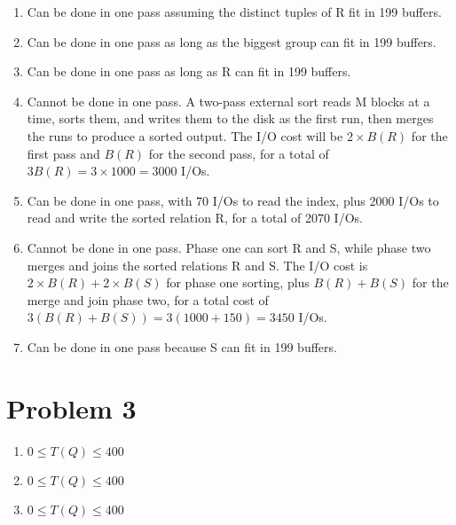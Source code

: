 \documentclass[a4paper, 12pt]{article}
\begin{document}
\begin{enumerate}[label=(\alph*)]
	\item Can be done in one pass assuming the distinct tuples of R fit in 199
		buffers.
	\item Can be done in one pass as long as the biggest group can fit in 199
		buffers.
	\item Can be done in one pass as long as R can fit in 199 buffers.
	\item Cannot be done in one pass. A two-pass external sort reads M blocks at
		a time, sorts them, and writes them to the disk as the first run, then
		merges the runs to produce a sorted output. The I/O cost will be $ 2
		\times B(R) $ for the first pass and $ B(R) $ for the second pass, for a
		total of $ 3 B(R) = 3 \times 1000 = 3000 $ I/Os.
	\item Can be done in one pass, with 70 I/Os to read the index, plus 2000
		I/Os to read and write the sorted relation R, for a total of 2070 I/Os.
	\item Cannot be done in one pass. Phase one can sort R and S, while phase
		two merges and joins the sorted relations R and S. The I/O cost is $ 2
		\times B(R) + 2 \times B(S) $ for phase one sorting, plus $ B(R) + B(S)
		$ for the merge and join phase two, for a total cost of $ 3 ( B(R) +
		B(S)) = 3 ( 1000 + 150 ) = 3450 $ I/Os.
	\item Can be done in one pass because S can fit in 199 buffers.
\end{enumerate}

\section*{Problem 3}

\begin{enumerate}
	\item $ 0 \leq T(Q) \leq 400 $
	\item $ 0 \leq T(Q) \leq 400 $
	\item $ 0 \leq T(Q) \leq 400 $
\end{enumerate}
\end{document}
